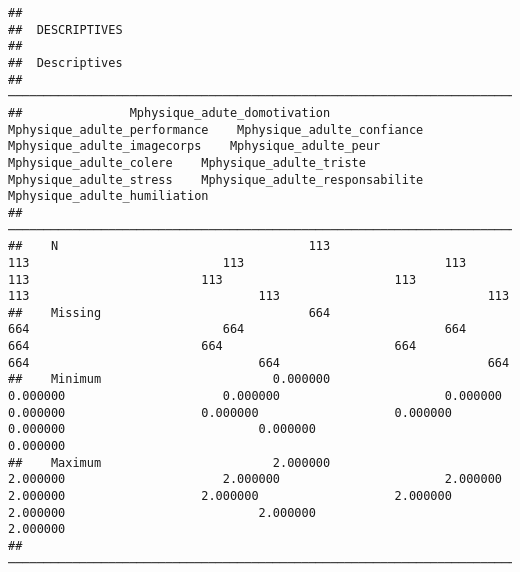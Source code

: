 \documentclass[
]{article}
\begin{document}
\begin{verbatim}
## 
##  DESCRIPTIVES
## 
##  Descriptives                                                                                                                                                                                                                                                                                                          
##  ───────────────────────────────────────────────────────────────────────────────────────────────────────────────────────────────────────────────────────────────────────────────────────────────────────────────────────────────────────────────────────────────────────────────────────────────────────────────────── 
##               Mphysique_adute_domotivation    Mphysique_adulte_performance    Mphysique_adulte_confiance    Mphysique_adulte_imagecorps    Mphysique_adulte_peur    Mphysique_adulte_colere    Mphysique_adulte_triste    Mphysique_adulte_stress    Mphysique_adulte_responsabilite    Mphysique_adulte_humiliation   
##  ───────────────────────────────────────────────────────────────────────────────────────────────────────────────────────────────────────────────────────────────────────────────────────────────────────────────────────────────────────────────────────────────────────────────────────────────────────────────────── 
##    N                                   113                             113                           113                            113                      113                        113                        113                        113                                113                             113   
##    Missing                             664                             664                           664                            664                      664                        664                        664                        664                                664                             664   
##    Minimum                        0.000000                        0.000000                      0.000000                       0.000000                 0.000000                   0.000000                   0.000000                   0.000000                           0.000000                        0.000000   
##    Maximum                        2.000000                        2.000000                      2.000000                       2.000000                 2.000000                   2.000000                   2.000000                   2.000000                           2.000000                        2.000000   
##  ─────────────────────────────────────────────────────────────────────────────────────────────────────────────────────────────────────────────────────────────────────────────────────────────────────────────────────────────────────────────────────────────────────────────────────────────────────────────────────
\end{verbatim}
\end{document}
